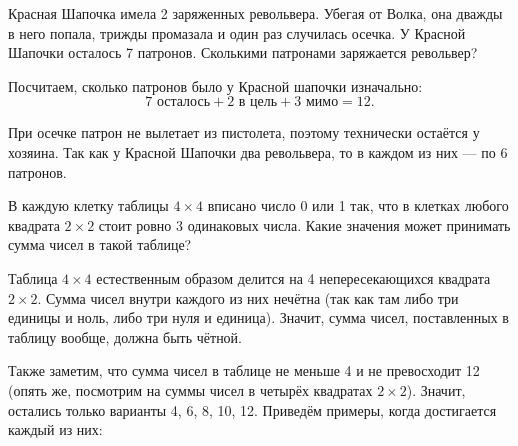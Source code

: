 
\begin{itemize}

	\itA Красная Шапочка имела 2 заряженных револьвера. Убегая от Волка, она дважды в него попала, трижды промазала и один раз случилась осечка. У Красной Шапочки осталось 7 патронов. Сколькими патронами заряжается револьвер?
	
	\itr Посчитаем, сколько патронов было у Красной шапочки изначально:
	$$7\text{ осталось} + 2\text{ в цель} + 3\text{ мимо} = 12.$$
	
	При осечке патрон не вылетает из пистолета, поэтому технически остаётся у хозяина. Так как у Красной Шапочки два револьвера, то в каждом из них — по 6 патронов.
	
	\itB В каждую клетку таблицы $4 \times 4$ вписано число 0 или 1 так, что в клетках любого квадрата $2 \times 2$ стоит ровно 3 одинаковых числа. Какие значения может принимать сумма чисел в такой таблице?
	
	\itr Таблица $4 \times 4$ естественным образом делится на 4 непересекающихся квадрата $2 \times 2$. Сумма чисел внутри каждого из них нечётна (так как там либо три единицы и ноль, либо три нуля и единица). Значит, сумма чисел, поставленных в таблицу вообще, должна быть чётной.
	
	Также заметим, что сумма чисел в таблице не меньше 4 и не превосходит 12 (опять же, посмотрим на суммы чисел в четырёх квадратах $2 \times 2$). Значит, остались только варианты 4, 6, 8, 10, 12. Приведём примеры, когда достигается каждый из них:
	

\end{itemize}
